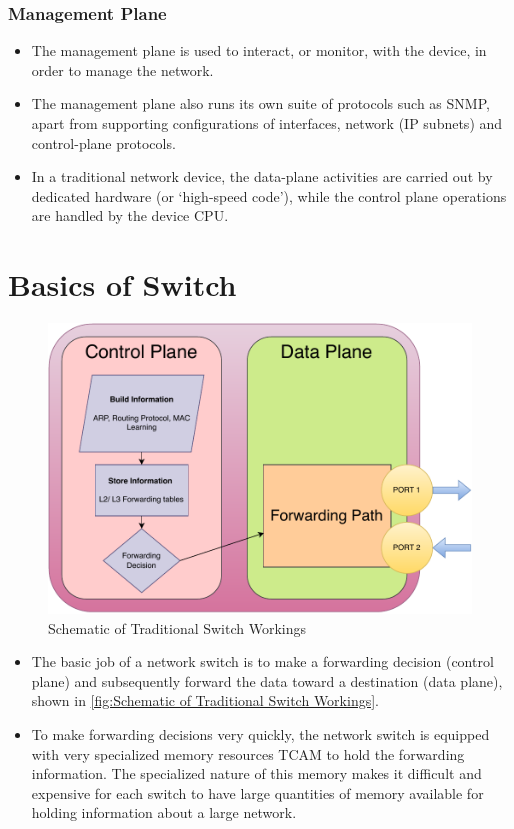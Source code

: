 \documentclass[12pt,letterpaper]{article}
\begin{document}
    \subsubsection{Management Plane}
        \begin{itemize}
            \item The management plane is used to interact, or monitor, with the device, in order to manage the network.
            \item The management plane also runs its own suite of protocols such as \ac{SNMP}, apart from supporting configurations of interfaces, network (IP subnets) and control-plane protocols.
            \item In a traditional network device, the data-plane activities are carried out by dedicated hardware (or ‘high-speed code’), while the control plane operations are handled by the device CPU.

        \end{itemize}

    \section{Basics of Switch}

    \begin{figure}[ht]
        \centering
        \includegraphics[height = 8 cm]{images/basicSwitch.drawio.pdf}
        \caption{Schematic of Traditional Switch Workings}
        \label{fig:Schematic of Traditional Switch Workings}
    \end{figure}

    \begin{itemize}
        \item The basic job of a network switch is to make a forwarding decision (control plane) and subsequently forward the data toward a destination (data plane), shown in \autoref{fig:Schematic of Traditional Switch Workings}.
        \item To make forwarding decisions very quickly, the network switch is equipped with very specialized memory resources \ac{TCAM} to hold the forwarding information. The specialized nature of this memory makes it difficult and expensive for each switch to have large quantities of memory available for holding information about a large network.
    \end{itemize}
\end{document}
